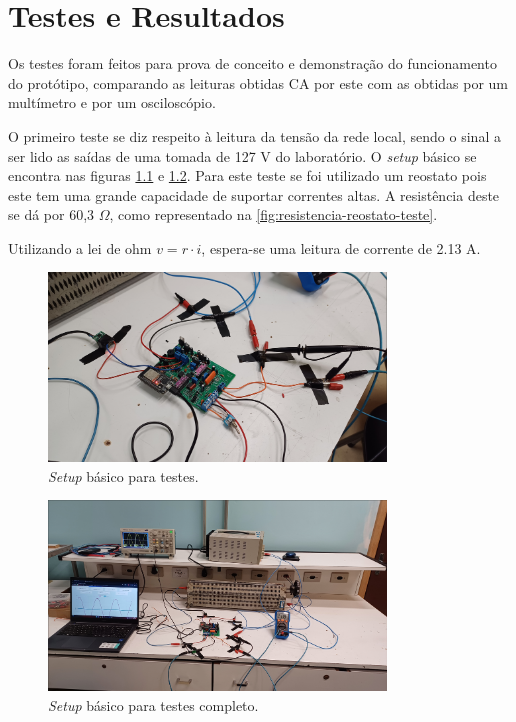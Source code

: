 
\chapter{Testes e Resultados}\label{cap:resultados}

Os testes foram feitos para prova de conceito e demonstração do funcionamento do protótipo, comparando as leituras obtidas \gls{CA} por este com as obtidas por um multímetro e por um osciloscópio.

O primeiro teste se diz respeito à leitura da tensão da rede local, sendo o sinal a ser lido as saídas de uma tomada de 127 V do laboratório. O \textit{setup} básico se encontra nas figuras \ref{fig:setup-main} e \ref{fig:setup-main2}. Para este teste se foi utilizado um reostato pois este tem uma grande capacidade de suportar correntes altas. A resistência deste se dá por 60,3 $\Omega$, como representado na \autoref{fig:resistencia-reostato-teste}.

Utilizando a lei de ohm $v = r \cdot  i$, espera-se uma leitura de corrente de 2.13 A.

\begin{figure}[htb!]
    \caption{\textit{Setup} básico para testes.}
    \label{fig:setup-main}
    \includegraphics[width=0.8\textwidth]{figuras/setup-basico.png}
    \fonte{}
\end{figure}

\begin{figure}[htb!]
    \caption{\textit{Setup} básico para testes completo.}
    \label{fig:setup-main2}
    \includegraphics[width=0.8\textwidth]{figuras/setup-basico-full.png}
    \fonte{}
\end{figure}

